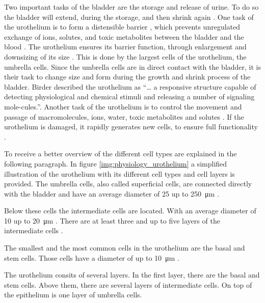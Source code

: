 Two important tasks of the bladder are the storage and release of urine. To do so the bladder will extend, during the storage, and then shrink again \cite{Karl-ErikAndersson2004}. One task of the urothelium is to form a distensible barrier \cite{Apodaca2004, Lazzeri2006, PuneetKhandelwal2009, Lewis2000, WRCross2005}, which prevents unregulated exchange of ions, solutes, and toxic metabolites between the bladder and the blood \cite{Apodaca2004, Lazzeri2006, PuneetKhandelwal2009, Lewis2000}. The urothelium ensures its barrier function, through enlargement and downsizing of its size . This is done by the largest cells of the urothelium, the umbrella cells. Since the umbrella cells are in direct contact with the bladder, it is their task to change size and form during the growth and shrink process of the bladder. Birder \cite{Birder2005} described the urothelium as “… a responsive structure capable of detecting physiological and chemical stimuli and releasing a number of signaling mole-cules.”. Another task of the urothelium is to control the movement and passage of macromolecules, ions, water, toxic metabolites and solutes \cite{Apodaca2004, PuneetKhandelwal2009}. If the urothelium is damaged, it rapidly generates new cells, to ensure full functionality \cite{Apodaca2004, Yamany2014, PuneetKhandelwal2009}.

To receive a better overview of the different cell types are explained in the following paragraph. In figure \ref{img:physiology_urothelium} a simplified illustration of the urothelium with its different cell types and cell layers is provided. \newline
The umbrella cells, also called superficial cells, are connected directly with the bladder and have an average diameter of 25 up to \SI{250}{\micro\metre} \cite{Yamany2014, PuneetKhandelwal2009}. 

Below these cells the intermediate cells are located. With an average diameter of 10 up to \SI{20}{\micro\metre} \cite{Yamany2014, PuneetKhandelwal2009}. There are at least three and up to five layers of the intermediate cells \cite{PuneetKhandelwal2009}. 

The smallest and the most common cells in the urothelium are the basal and stem cells. Those cells have a diameter of up to \SI{10}{\micro\metre} \cite{Lazzeri2006, PuneetKhandelwal2009}. 

The urothelium consits of several layers. In the first layer, there are the basal and stem cells. Above them, there are several layers of intermediate cells. On top of the epithelium is one layer of umbrella cells.

